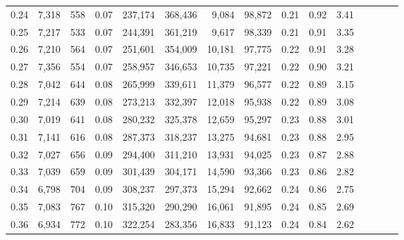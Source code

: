 \begin{tabular}{rrrcrrrrrrrrrrr}
0.24 &   7,318 &     558 &                                       0.07 &  237,174 &  368,436 &    9,084 &   98,872 &  0.21 &  0.92 &                         3.41 \\
0.25 &   7,217 &     533 &                                       0.07 &  244,391 &  361,219 &    9,617 &   98,339 &  0.21 &  0.91 &                         3.35 \\
0.26 &   7,210 &     564 &                                       0.07 &  251,601 &  354,009 &   10,181 &   97,775 &  0.22 &  0.91 &                         3.28 \\
0.27 &   7,356 &     554 &                                       0.07 &  258,957 &  346,653 &   10,735 &   97,221 &  0.22 &  0.90 &                         3.21 \\
0.28 &   7,042 &     644 &                                       0.08 &  265,999 &  339,611 &   11,379 &   96,577 &  0.22 &  0.89 &                         3.15 \\
0.29 &   7,214 &     639 &                                       0.08 &  273,213 &  332,397 &   12,018 &   95,938 &  0.22 &  0.89 &                         3.08 \\
0.30 &   7,019 &     641 &                                       0.08 &  280,232 &  325,378 &   12,659 &   95,297 &  0.23 &  0.88 &                         3.01 \\
0.31 &   7,141 &     616 &                                       0.08 &  287,373 &  318,237 &   13,275 &   94,681 &  0.23 &  0.88 &                         2.95 \\
0.32 &   7,027 &     656 &                                       0.09 &  294,400 &  311,210 &   13,931 &   94,025 &  0.23 &  0.87 &                         2.88 \\
0.33 &   7,039 &     659 &                                       0.09 &  301,439 &  304,171 &   14,590 &   93,366 &  0.23 &  0.86 &                         2.82 \\
0.34 &   6,798 &     704 &                                       0.09 &  308,237 &  297,373 &   15,294 &   92,662 &  0.24 &  0.86 &                         2.75 \\
0.35 &   7,083 &     767 &                                       0.10 &  315,320 &  290,290 &   16,061 &   91,895 &  0.24 &  0.85 &                         2.69 \\
0.36 &   6,934 &     772 &                                       0.10 &  322,254 &  283,356 &   16,833 &   91,123 &  0.24 &  0.84 &                         2.62 \\

\end{tabular}
